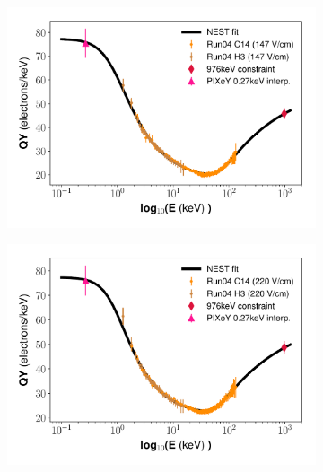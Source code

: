 \begin{figure}[h!]
\centering
\begin{subfigure}{0.5\textwidth}
  \centering
  \includegraphics[width=\textwidth]{Figures/Yields_fit_old/NEST_fit_147Vcm_old_dcm.pdf}
  \caption{}
\end{subfigure}%
\begin{subfigure}{0.5\textwidth}
  \centering
  \includegraphics[width=\textwidth]{Figures/Yields_fit_old/NEST_fit_220Vcm_old_dcm.pdf}
  \caption{}
\end{subfigure}
\begin{subfigure}{0.5\textwidth}
  \centering

\end{subfigure}
\end{figure}
